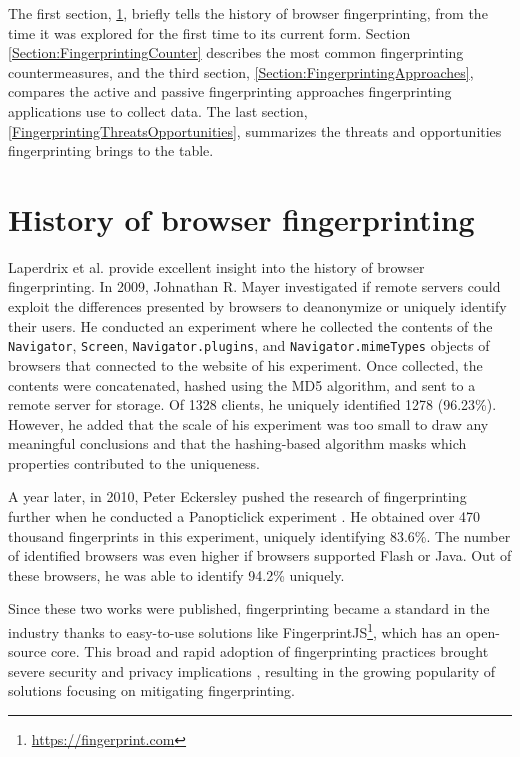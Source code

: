 The first section, \ref{Section:FingerprintingHistory}, briefly tells the history of browser fingerprinting, from the time it was explored for the first time to its current form. Section \ref{Section:FingerprintingCounter} describes the most common fingerprinting countermeasures, and the third section, \ref{Section:FingerprintingApproaches}, compares the active and passive fingerprinting approaches fingerprinting applications use to collect data. The last section, \ref{FingerprintingThreatsOpportunities}, summarizes the threats and opportunities fingerprinting brings to the table.

\section{History of browser fingerprinting}
\label{Section:FingerprintingHistory}

Laperdrix et al. \cite{FingerprintingSurvey} provide excellent insight into the history of browser fingerprinting. In 2009, Johnathan R. Mayer investigated \cite{MayerAnyPerson} if remote servers could exploit the differences presented by browsers to deanonymize or uniquely identify their users. He conducted an experiment where he collected the contents of the \texttt{Navigator}, \texttt{Screen}, \texttt{Navigator.plugins}, and \texttt{Navigator.mimeTypes} objects of browsers that connected to the website of his experiment. Once collected, the contents were concatenated, hashed using the MD5 algorithm, and sent to a remote server for storage. Of 1328 clients, he uniquely identified 1278 (96.23\%). However, he added that the scale of his experiment was too small to draw any meaningful conclusions and that the hashing-based algorithm masks which properties contributed to the uniqueness.

A year later, in 2010, Peter Eckersley pushed the research of fingerprinting further when he conducted a Panopticlick experiment \cite{EckersleyHowUnique}. He obtained over 470 thousand fingerprints in this experiment, uniquely identifying 83.6\%. The number of identified browsers was even higher if browsers supported Flash or Java. Out of these browsers, he was able to identify 94.2\% uniquely.

Since these two works were published, fingerprinting became a standard in the industry thanks to easy-to-use solutions like FingerprintJS\footnote{\url{https://fingerprint.com}}, which has an open-source core. This broad and rapid adoption of fingerprinting practices brought severe security and privacy implications \cite{WP224Fingerprinting}, resulting in the growing popularity of solutions focusing on mitigating fingerprinting.

